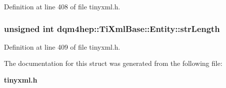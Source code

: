 Definition at line 408 of file tinyxml.\+h.

\subsubsection[{str\+Length}]{\setlength{\rightskip}{0pt plus 5cm}unsigned int dqm4hep\+::\+Ti\+Xml\+Base\+::\+Entity\+::str\+Length}\label{structdqm4hep_1_1TiXmlBase_1_1Entity_a431c0a5bf983b1ebdf36aaa49d724f68}


Definition at line 409 of file tinyxml.\+h.



The documentation for this struct was generated from the following file\+:\begin{DoxyCompactItemize}
\item 
{\bf tinyxml.\+h}\end{DoxyCompactItemize}
